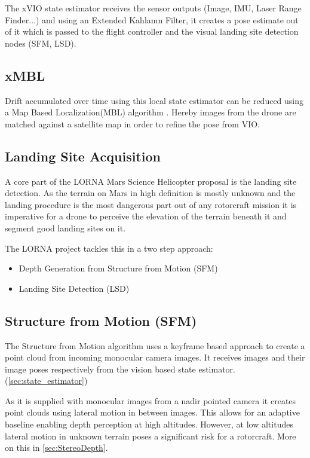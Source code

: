 The xVIO state estimator receives the sensor outputs (Image, IMU, Laser Range
Finder...) and using an Extended Kahlamn Filter, it creates a pose estimate out of it which is passed to the flight controller and the visual landing site detection nodes (SFM, LSD).

\subsection{xMBL}

Drift accumulated over time using this local state estimator can be reduced using a Map Based Localization(MBL) algorithm \citep{XMBL}. Hereby images from the drone are matched against a satellite map in order to refine the pose from VIO.


\subsection{Landing Site Acquisition }

A core part of the LORNA Mars Science Helicopter proposal is the landing site detection. As the terrain on Mars in high definition is mostly unknown and the landing procedure is the most dangerous part out of any rotorcraft mission it is imperative for a drone to perceive the elevation of the terrain beneath it and segment good landing sites on it.

The LORNA project tackles this in a two step approach:

\begin{itemize}
    \item Depth Generation from Structure from Motion (SFM) \citep{SFM}
    \item Landing Site Detection (LSD) \citep{LSD1, LSD2}
\end{itemize}

\subsection{Structure from Motion (SFM)}\label{subsec:related_work:SFM}

The Structure from Motion algorithm \citep{SFM} uses a keyframe based approach to create a point cloud from incoming monocular camera images. It receives images and their image poses respectively from the vision based state estimator. (\ref{sec:state_estimator})

As it is supplied with monocular images from a nadir pointed camera it creates point clouds using lateral motion in between images. This allows for an adaptive baseline enabling depth perception at high altitudes. However, at low altitudes lateral motion in unknown terrain poses a significant risk for a rotorcraft. More on this in \cref{sec:StereoDepth}.

